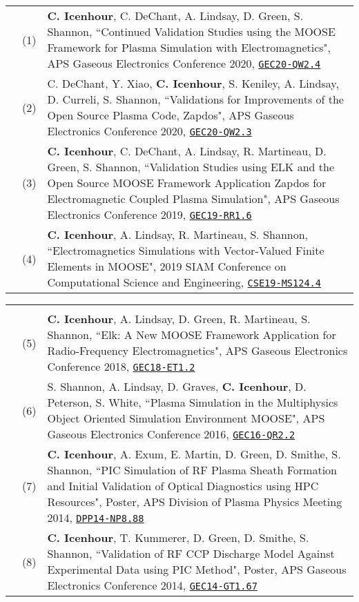 \documentclass{article}
\begin{document}
	\begin{tabularx}{\textwidth}{l l X}
		\hspace{2em}
      & (1)  & \textbf{C. Icenhour}, C. DeChant, A. Lindsay, D. Green, S. Shannon, ``Continued Validation Studies using the MOOSE Framework for Plasma Simulation with Electromagnetics", APS Gaseous Electronics Conference 2020, \href{https://meetings.aps.org/Meeting/GEC20/Session/QW2.4}{\texttt{GEC20-QW2.4}} \\
      & (2)  & C. DeChant, Y. Xiao, \textbf{C. Icenhour}, S. Keniley, A. Lindsay, D. Curreli, S. Shannon, ``Validations for Improvements of the Open Source Plasma Code, Zapdos", APS Gaseous Electronics Conference 2020, \href{https://meetings.aps.org/Meeting/GEC20/Session/QW2.3}{\texttt{GEC20-QW2.3}} \\
			& (3)  & \textbf{C. Icenhour}, C. DeChant, A. Lindsay, R. Martineau, D. Green, S. Shannon, ``Validation Studies using ELK and the Open Source MOOSE Framework Application Zapdos for Electromagnetic Coupled Plasma Simulation", APS Gaseous Electronics Conference 2019, \href{http://meetings.aps.org/Meeting/GEC19/Session/RR1.6}{\texttt{GEC19-RR1.6}} \\
			& (4)  & \textbf{C. Icenhour}, A. Lindsay, R. Martineau, S. Shannon, ``Electromagnetics Simulations with Vector-Valued Finite Elements in MOOSE", 2019 SIAM Conference on Computational Science and Engineering, \href{http://meetings.siam.org/sess/dsp_talk.cfm?p=96892}{\texttt{CSE19-MS124.4}} \\
  \end{tabularx}

  \begin{tabularx}{\textwidth}{l l X}
    \hspace{1em} & & \\
			& (5)  & \textbf{C. Icenhour}, A. Lindsay, D. Green, R. Martineau, S. Shannon, ``Elk: A New MOOSE Framework Application for Radio-Frequency Electromagnetics", APS Gaseous Electronics Conference 2018, \href{http://meetings.aps.org/link/BAPS.2018.GEC.ET1.2}{\texttt{GEC18-ET1.2}} \\
			& (6)  &  S. Shannon, A. Lindsay, D. Graves, \textbf{C. Icenhour}, D. Peterson, S. White, ``Plasma Simulation in the Multiphysics Object Oriented Simulation Environment MOOSE", APS Gaseous Electronics Conference 2016, \href{http://meetings.aps.org/link/BAPS.2016.GEC.QR2.2}{\texttt{GEC16-QR2.2}} \\
			& (7)  & \textbf{C. Icenhour}, A. Exum, E. Martin, D. Green, D. Smithe, S. Shannon, ``PIC Simulation of RF Plasma Sheath Formation and Initial Validation of Optical Diagnostics using HPC Resources", Poster, APS Division of Plasma Physics Meeting 2014, \href{http://meetings.aps.org/link/BAPS.2014.DPP.NP8.88}{\texttt{DPP14-NP8.88}} \\
			& (8)  & \textbf{C. Icenhour}, T. Kummerer, D. Green, D. Smithe, S. Shannon, ``Validation of RF CCP Discharge Model Against Experimental Data using PIC Method", Poster, APS Gaseous Electronics Conference 2014, \href{http://meetings.aps.org/link/BAPS.2014.GEC.GT1.67}{\texttt{GEC14-GT1.67}}
	\end{tabularx}
\end{document}
